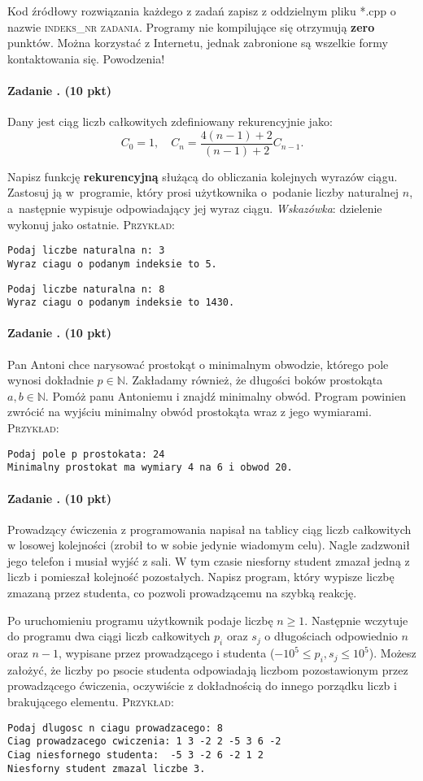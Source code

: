 \documentclass[12pt]{article}
\newcounter{zadanie}
\newcommand{\zadanie}{\stepcounter{zadanie}\paragraph*{Zadanie \arabic{zadanie}. (10 pkt)}}
\begin{document}

\small Kod źródłowy rozwiązania każdego z zadań zapisz z oddzielnym pliku *.cpp o nazwie \textsc{indeks}\_\textsc{nr zadania}. Programy nie kompilujące się otrzymują {\bf zero} punktów. Można korzystać z Internetu, jednak zabronione są wszelkie formy kontaktowania się. Powodzenia!

\zadanie

Dany jest ciąg liczb całkowitych zdefiniowany rekurencyjnie jako:
\[
C_0 = 1, \quad C_n = \frac{4(n-1)+2}{(n-1)+2} C_{n-1}.
\]

Napisz funkcję \textbf{rekurencyjną} służącą do obliczania kolejnych wyrazów ciągu. Zastosuj ją w~programie, który prosi użytkownika o~podanie liczby naturalnej $n$, a~następnie wypisuje odpowiadający jej wyraz ciągu. \textit {Wskazówka}: dzielenie wykonuj jako ostatnie. \textsc{Przykład}:
\begin{verbatim}
Podaj liczbe naturalna n: 3
Wyraz ciagu o podanym indeksie to 5.
\end{verbatim}

\begin{verbatim}
Podaj liczbe naturalna n: 8
Wyraz ciagu o podanym indeksie to 1430.
\end{verbatim}

\zadanie
Pan Antoni chce narysować prostokąt o minimalnym obwodzie, którego pole wynosi dokładnie $p\in \mathbb{N}$. Zakładamy również, że długości boków prostokąta $a,b\in \mathbb{N}$. Pomóż panu Antoniemu i znajdź minimalny obwód. Program powinien zwrócić na wyjściu minimalny obwód prostokąta wraz z jego wymiarami. \textsc{Przykład}:
\begin{verbatim}
Podaj pole p prostokata: 24
Minimalny prostokat ma wymiary 4 na 6 i obwod 20.
\end{verbatim}

\zadanie
Prowadzący ćwiczenia z programowania napisał na tablicy ciąg liczb całkowitych w losowej kolejności (zrobił to w sobie jedynie wiadomym celu). Nagle zadzwonił jego telefon i musiał wyjść z sali. W tym czasie niesforny student zmazał jedną z liczb i pomieszał kolejność pozostałych. Napisz program, który wypisze liczbę zmazaną przez studenta, co pozwoli prowadzącemu na szybką reakcję.
\vspace{0.2 cm}

Po uruchomieniu programu użytkownik podaje liczbę $n \geq 1$. Następnie wczytuje do programu dwa ciągi liczb całkowitych $p_i$ oraz $s_j$ o długościach odpowiednio $n$ oraz $n-1$, wypisane przez prowadzącego i studenta ($-10^5\leq p_i, s_j\leq 10^5$). Możesz założyć, że liczby po psocie studenta odpowiadają liczbom pozostawionym przez prowadzącego ćwiczenia, oczywiście z dokładnością do innego porządku liczb i brakującego elementu.
\textsc{Przykład}:
\begin{verbatim}
Podaj dlugosc n ciagu prowadzacego: 8
Ciag prowadzacego cwiczenia: 1 3 -2 2 -5 3 6 -2
Ciag niesfornego studenta:  -5 3 -2 6 -2 1 2
Niesforny student zmazal liczbe 3.
\end{verbatim}
\end{document}
